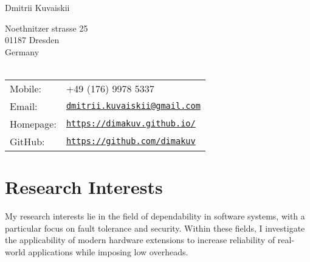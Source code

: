 \documentclass[letterpaper]{article}
\def\name{Dmitrii Kuvaiskii}
\begin{document}
{\huge \name}


\vspace{0.25in}

\begin{minipage}{0.45\linewidth}
Noethnitzer strasse 25\\
01187 Dresden\\
Germany\\
\\

 
\end{minipage}
\begin{minipage}{0.45\linewidth}
  \begin{tabular}{ll}
      Mobile: & +49 (176) 9978 5337\\
      Email: & \href{mailto:dmitrii.kuvaiskii@gmail.com}{\tt dmitrii.kuvaiskii@gmail.com} \\
    Homepage: & \href{https://dimakuv.github.io/}{\tt https://dimakuv.github.io/} \\
    GitHub: & \href{https://github.com/dimakuv}{\tt https://github.com/dimakuv} \\
  \end{tabular}
\end{minipage}


\section*{Research Interests}

My research interests lie in the field of dependability in software systems, with a particular focus on fault tolerance and security. Within these fields, I investigate the applicability of modern hardware extensions to increase reliability of real-world applications while imposing low overheads.

\end{document}
